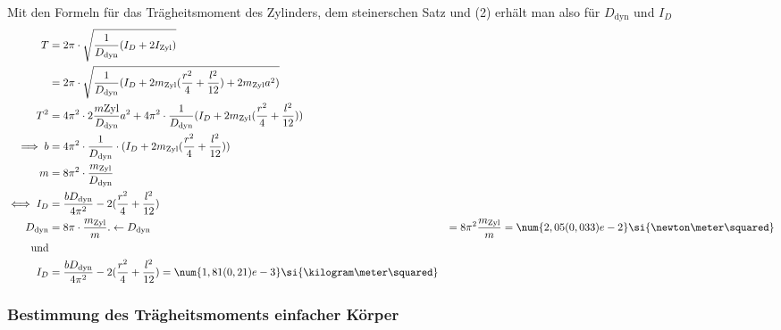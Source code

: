 Mit den Formeln für das Trägheitsmoment des Zylinders, dem steinerschen Satz 
und (2) erhält man also für $D_{\text{dyn}}$ und $I_D$
\begin{align*}
    T &= 
    2\pi \cdot \sqrt{\frac{1}{D_{\text{dyn}}}(I_D+2I_\text{Zyl})}\\
    &=
    2\pi \cdot \sqrt{\frac{1}{D_{\text{dyn}}}(I_D+2 m_\text{Zyl}(\frac{r^2}{4}+\frac{l^2}{12})+2 m_\text{Zyl}a^2)}\\
    T^2 &=
    4\pi^2 \cdot 2\frac{m\text{Zyl}} {D_{\text{dyn}}}a^2 + 4\pi^2 \cdot \frac{1}{D_{\text{dyn}}}(I_D+2 m_\text{Zyl}(\frac{r^2}{4}+\frac{l^2}{12}))\\
    
    \implies b &= 4\pi^2 \cdot \frac{1}{D_{\text{dyn}}}\cdot(I_D+2 m_\text{Zyl}(\frac{r^2}{4}+\frac{l^2}{12}))\\
    m &= 8\pi^2\cdot\frac{m_\text{Zyl}}{D_\text{dyn}}\\
    \iff I_D 
    &= \frac{bD_{\text{dyn}}}{4\pi^2}-2(\frac{r^2}{4}+\frac{l^2}{12})\\
    D_{\text{dyn}}
    &= 8\pi \cdot \frac{m_{\text{Zyl}}}{m}.
    
    \leftarrow D_{\text{dyn}} &= 8\pi^2\frac{m_{\text{Zyl}}}{m} = \num{2,05(0,033)e-2}\si{\newton\meter\squared} \\    
    \text{und}\\
    I_D &= \frac{bD_{\text{dyn}}}{4\pi^2}-2(\frac{r^2}{4}+\frac{l^2}{12}) = \num{1,81(0,21)e-3} \si{\kilogram \meter \squared}
\end{align*}


\subsubsection{Bestimmung des Trägheitsmoments einfacher Körper}
\label{subs:Bestimmung des Trägheitsmoents einfacher Körper}

